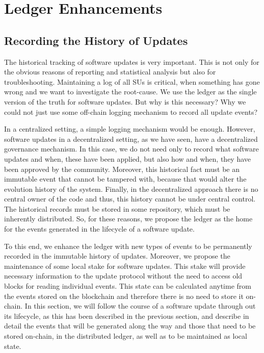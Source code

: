 \section{Ledger Enhancements}

\subsection{Recording the History of Updates}
The historical tracking of software updates is very important. This is not only for the obvious reasons of reporting and statistical analysis but also for troubleshooting. Maintaining a log of all SUs is critical, when something has gone wrong and we want to investigate the root-cause. We use the ledger as the single version of the truth for software updates. But why is this necessary? Why we could not just use some off-chain logging mechanism to record all update events?

In a centralized setting, a simple logging mechanism would be enough. However, software updates in a decentralized setting, as we have seen, have a decentralized governance mechanism. In this case, we do not need only to record what software updates and when, these have been applied, but also how and when, they have been approved by the community. Moreover, this historical fact must be an immutable event that cannot be tampered with, because that would alter the evolution history of the system. Finally, in the decentralized approach there is no central owner of the code and thus, this history cannot be under central control. The historical records  must be stored in some repository, which must be inherently distributed. So, for these reasons, we propose the ledger as the home for the events generated in the lifecycle of a software update.

To this end, we enhance the ledger with new types of events to be permanently recorded in the immutable history of updates. Moreover, we propose the maintenance of some local stake for software updates. This stake will provide necessary information to the update protocol without the need to access old blocks for reading individual events. This state can be calculated anytime from the events stored on the blockchain and therefore there is no need to store it on-chain. In this section, we will follow the course of a software update through out its lifecycle, as this has been described in the previous section, and describe in detail the events that will be generated along the way and those that need to be stored on-chain, in the distributed ledger, as well as to be maintained as local state.

